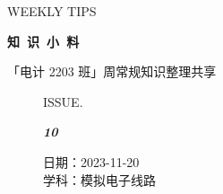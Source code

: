 \documentclass[UTF8]{ctexart}
\newcommand\Black[1]{\textcolor[gray]{0.3}{#1}}
\newcommand\Brown[1]{\textcolor[HTML]{998A4E}{#1}}
\newcommand\IssueNumber{10}
\newcommand\Date{2023-11-20}
\newcommand\Subject{模拟电子线路}
\begin{document}
\BgThispage
\begin{center}
{\scriptsize\Issue \textcolor[HTML]{C8BA83}{WEEKLY TIPS}}

{\Huge\bfseries\TitleFont \Black{知\ 识\ 小\ 料}}

\vspace{-0.1cm}
{\footnotesize \Brown{「电计 2203 班」周常规知识整理共享}}
\end{center}

\vspace{-0.5cm}

\begin{figure}[H]
\hspace{1cm}
\begin{minipage}[t]{0.3\textwidth}
\centering
    \Brown{ISSUE.}

    \vspace{-0.6cm}
    \Huge \Issue\slshape\bfseries\Black{\IssueNumber}
\end{minipage}
\hfill
\begin{minipage}[t]{0.3\textwidth}
\centering
    \Brown{日期：\Date} \\
\vspace{-0.1cm}
    \Brown{学科：\Subject} \\
\end{minipage}
\hspace{0.8cm}
\end{figure}
\end{document}
